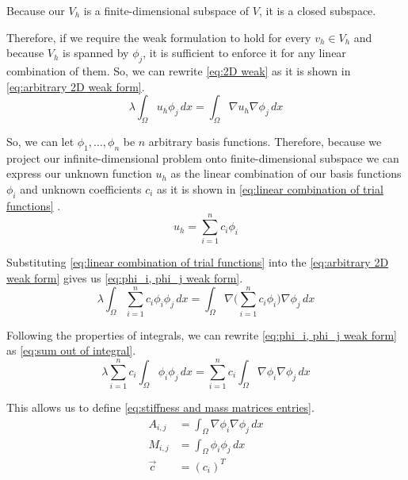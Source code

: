 \documentclass[acmsmall,screen]{MapleTrans}
\begin{document}
Because our $V_h$ is a finite-dimensional subspace of $V$, it is a closed subspace.

Therefore, if we require the weak formulation to hold for every $v_h \in V_h$ and because $V_h$ is spanned by $\phi_j$, it is sufficient to enforce it for any linear combination of them. So, we can rewrite \eqref{eq:2D weak} as it is shown in \eqref{eq:arbitrary 2D weak form}.
\begin{equation}
    \lambda \int_{\Omega}u_h\phi_j \, dx = \int_{\Omega}\nabla{u_h} \nabla{\phi_j} \, dx
    \label{eq:arbitrary 2D weak form}
\end{equation}

So, we can let $\phi_{1}, \dots , \phi_{n}$ be $n$ arbitrary basis functions. Therefore, because we project our infinite-dimensional problem onto finite-dimensional subspace we can express our unknown function $u_h$ as the linear combination of our basis functions $\phi_i$ and unknown coefficients $c_i$ as it is shown in \eqref{eq:linear combination of trial functions} \cite{b0,b10}.
\begin{equation}
    u_h = \sum^n_{i=1}c_i \phi_i
    \label{eq:linear combination of trial functions}
\end{equation}

Substituting \eqref{eq:linear combination of trial functions} into the \eqref{eq:arbitrary 2D weak form} gives us \eqref{eq:phi_i, phi_j weak form}.
\begin{equation}
    \lambda \int_\Omega \sum^n_{i=1}c_i \phi_i\phi_j \, dx = \int_\Omega \nabla \Bigg(\sum^n_{i=1}c_i \phi_i\Bigg)\nabla{\phi_j} \, dx
    \label{eq:phi_i, phi_j weak form}
\end{equation}

Following the properties of integrals, we can rewrite \eqref{eq:phi_i, phi_j weak form} as \eqref{eq:sum out of integral}.
\begin{equation}
    \lambda \sum^n_{i=1}c_i \int_\Omega \phi_i\phi_j \, dx = \sum^n_{i=1}c_i \int_\Omega \nabla{\phi_i}\nabla{\phi_j} \, dx
    \label{eq:sum out of integral}
\end{equation}

This allows us to define \eqref{eq:stiffness and mass matrices entries}.
\begin{equation}
\begin{aligned}
    A_{i,j} &= \int_\Omega \nabla{\phi_i}\nabla{\phi_j} \, dx \\
    M_{i,j} &= \int_\Omega \phi_i\phi_j \, dx \\
    \vec{c} &= (c_i)^T
    \label{eq:stiffness and mass matrices entries}
\end{aligned}
\end{equation}
\end{document}
